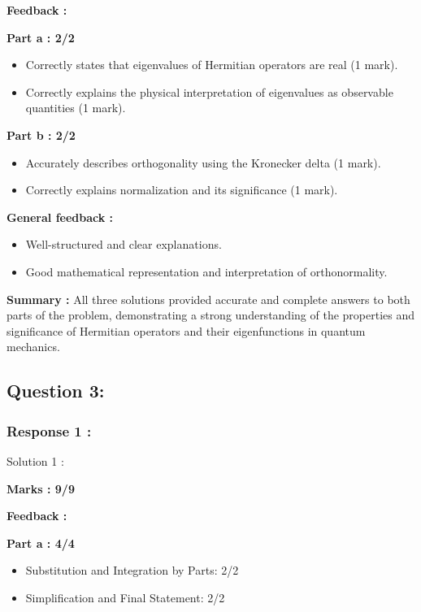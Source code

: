 \documentclass[a4paper,11pt]{article}
\begin{document}
\textbf{Feedback : }

\textbf{Part a : 2/2}

\begin{itemize}
    \item Correctly states that eigenvalues of Hermitian operators are real (1 mark).
    \item Correctly explains the physical interpretation of eigenvalues as observable quantities (1 mark).

\end{itemize}


\textbf{Part b : 2/2}

\begin{itemize}
    \item Accurately describes orthogonality using the Kronecker delta (1 mark).
    \item Correctly explains normalization and its significance (1 mark).
\end{itemize}


\textbf{General feedback :}

\begin{itemize}
    \item Well-structured and clear explanations.
    \item Good mathematical representation and interpretation of orthonormality.
\end{itemize}

\textbf{Summary :}
All three solutions provided accurate and complete answers to both parts of the problem, demonstrating a strong understanding of the properties and significance of Hermitian operators and their eigenfunctions in quantum mechanics.






\subsection*{Question 3:}

\subsubsection*{Response 1 :}

Solution 1 :

\textbf{Marks : 9/9}

\textbf{Feedback :}

\textbf{Part a : 4/4}

\begin{itemize}
    \item Substitution and Integration by Parts: 2/2
    \item Simplification and Final Statement: 2/2
\end{itemize}
\end{document}
